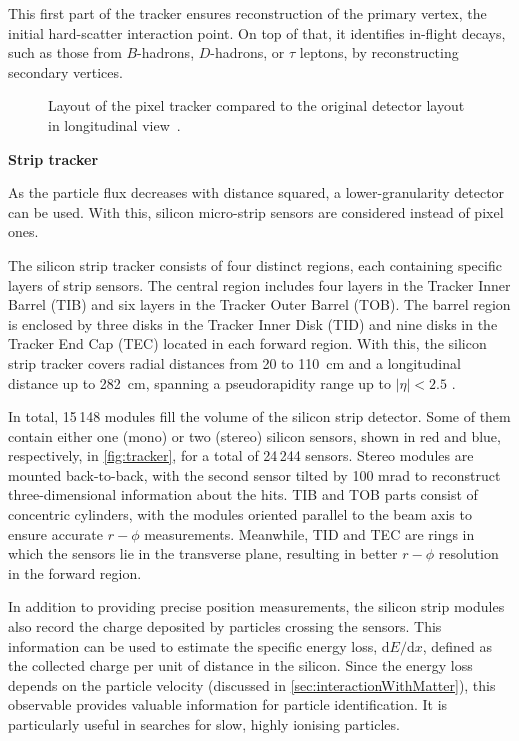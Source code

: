 This first part of the tracker ensures reconstruction of the primary vertex, the initial hard-scatter interaction point. On top of that, it identifies in-flight decays, such as those from $B$-hadrons, $D$-hadrons, or $\tau$ leptons, by reconstructing secondary vertices.

\clearpage

\begin{figure}[h!]
    \centering
    
    \caption{Layout of the pixel tracker compared to the original detector layout in longitudinal view~\cite{CMSPhase1Pixel2021}.}
    \label{fig:pixeltracker}
\end{figure}

\vspace{0.5 cm}
\noindent \textbf{Strip tracker}
\vspace{0.5 cm}

As the particle flux decreases with distance squared, a lower-granularity detector can be used. With this, silicon micro-strip sensors are considered instead of pixel ones.

The silicon strip tracker consists of four distinct regions, each containing specific layers of strip sensors. The central region includes four layers in the Tracker Inner Barrel (TIB) and six layers in the Tracker Outer Barrel (TOB). The barrel region is enclosed by three disks in the Tracker Inner Disk (TID) and nine disks in the Tracker End Cap (TEC) located in each forward region. With this, the silicon strip tracker covers radial distances from 20 to 110~cm and a longitudinal distance up to 282~cm, spanning a pseudorapidity range up to $|\eta|<2.5$ \cite{CMStracker}.

In total, 15\,148 modules fill the volume of the silicon strip detector. Some of them contain either one (mono) or two (stereo) silicon sensors, shown in red and blue, respectively, in \cref{fig:tracker}, for a total of 24\,244 sensors. Stereo modules are mounted back-to-back, with the second sensor tilted by 100 mrad to reconstruct three-dimensional information about the hits. TIB and TOB parts consist of concentric cylinders, with the modules oriented parallel to the beam axis to ensure accurate $r{-}\phi$ measurements. Meanwhile, TID and TEC are rings in which the sensors lie in the transverse plane, resulting in better $r{-}\phi$ resolution in the forward region.

In addition to providing precise position measurements, the silicon strip modules also record the charge deposited by particles crossing the sensors. This information can be used to estimate the specific energy loss, d$E/$d$x$, defined as the collected charge per unit of distance in the silicon. Since the energy loss depends on the particle velocity (discussed in \cref{sec:interactionWithMatter}), this observable provides valuable information for particle identification. It is particularly useful in searches for slow, highly ionising particles.

